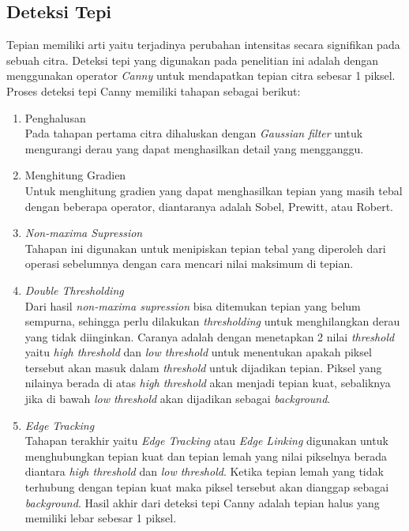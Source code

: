 \subsection{Deteksi Tepi}
\noindent Tepian memiliki arti yaitu terjadinya perubahan intensitas secara signifikan pada sebuah citra. Deteksi tepi yang digunakan pada penelitian ini adalah dengan menggunakan operator \textit{Canny} untuk mendapatkan tepian citra sebesar 1 piksel. Proses deteksi tepi Canny memiliki tahapan sebagai berikut:
\begin{enumerate}
	\item Penghalusan \\
	Pada tahapan pertama citra dihaluskan dengan \textit{Gaussian filter} untuk mengurangi derau yang dapat menghasilkan detail yang mengganggu.
	\item Menghitung Gradien \\
	Untuk menghitung gradien yang dapat menghasilkan tepian yang masih tebal dengan beberapa operator, diantaranya adalah Sobel, Prewitt, atau Robert.
	\item \textit{Non-maxima Supression} \\
	Tahapan ini digunakan untuk menipiskan tepian tebal yang diperoleh dari operasi sebelumnya dengan cara mencari nilai maksimum di tepian.
	\item \textit{Double Thresholding} \\
	Dari hasil \textit{non-maxima supression} bisa ditemukan tepian yang belum sempurna, sehingga perlu dilakukan \textit{thresholding} untuk menghilangkan derau yang tidak diinginkan. Caranya adalah dengan menetapkan 2 nilai \textit{threshold} yaitu \textit{high threshold} dan \textit{low threshold} untuk menentukan apakah piksel tersebut akan masuk dalam \textit{threshold} untuk dijadikan tepian. Piksel yang nilainya berada di atas \textit{high threshold} akan menjadi tepian kuat, sebaliknya jika di bawah \textit{low threshold} akan dijadikan sebagai \textit{background}.
	\item \textit{Edge Tracking} \\
	Tahapan terakhir yaitu \textit{Edge Tracking} atau \textit{Edge Linking} digunakan untuk menghubungkan tepian kuat dan tepian lemah yang nilai pikselnya berada diantara \textit{high threshold} dan \textit{low threshold}. Ketika tepian lemah yang tidak terhubung dengan tepian kuat maka piksel tersebut akan dianggap sebagai \textit{background}. Hasil akhir dari deteksi tepi Canny adalah tepian halus yang memiliki lebar sebesar 1 piksel.\\
\end{enumerate} 

